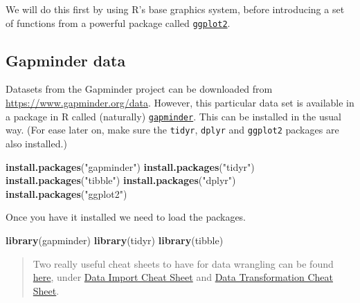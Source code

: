 \documentclass[]{book}
\newenvironment{Shaded}{\begin{snugshade}}{\end{snugshade}}
\newcommand{\KeywordTok}[1]{\textcolor[rgb]{0.13,0.29,0.53}{\textbf{{#1}}}}
\newcommand{\StringTok}[1]{\textcolor[rgb]{0.31,0.60,0.02}{{#1}}}
\newcommand{\NormalTok}[1]{{#1}}
\theoremstyle{definition}
\theoremstyle{definition}
\theoremstyle{definition}
\theoremstyle{remark}
\begin{document}
We will do this first by using R's base graphics system, before
introducing a set of functions from a powerful package called
\href{https://cran.r-project.org/web/packages/ggplot2/index.html}{\texttt{ggplot2}}.

\subsection{Gapminder data}\label{gapminder-data}

Datasets from the Gapminder project can be downloaded from
\url{https://www.gapminder.org/data}. However, this particular data set
is available in a package in R called (naturally)
\href{https://cran.r-project.org/web/packages/gapminder/index.html}{\texttt{gapminder}}.
This can be installed in the usual way. (For ease later on, make sure
the \texttt{tidyr}, \texttt{dplyr} and \texttt{ggplot2} packages are
also installed.)

\begin{Shaded}
\begin{Highlighting}[]
\KeywordTok{install.packages}\NormalTok{(}\StringTok{"gapminder"}\NormalTok{)}
\KeywordTok{install.packages}\NormalTok{(}\StringTok{"tidyr"}\NormalTok{)}
\KeywordTok{install.packages}\NormalTok{(}\StringTok{"tibble"}\NormalTok{)}
\KeywordTok{install.packages}\NormalTok{(}\StringTok{"dplyr"}\NormalTok{)}
\KeywordTok{install.packages}\NormalTok{(}\StringTok{"ggplot2"}\NormalTok{)}
\end{Highlighting}
\end{Shaded}

Once you have it installed we need to load the packages.

\begin{Shaded}
\begin{Highlighting}[]
\KeywordTok{library}\NormalTok{(gapminder)}
\KeywordTok{library}\NormalTok{(tidyr)}
\KeywordTok{library}\NormalTok{(tibble)}
\end{Highlighting}
\end{Shaded}

\begin{quote}
Two really useful cheat sheets to have for data wrangling can be found
\href{https://www.rstudio.com/resources/cheatsheets/}{here}, under
\href{https://github.com/rstudio/cheatsheets/raw/master/source/pdfs/data-import-cheatsheet.pdf}{Data
Import Cheat Sheet} and
\href{https://github.com/rstudio/cheatsheets/raw/master/source/pdfs/data-transformation-cheatsheet.pdf}{Data
Transformation Cheat Sheet}.
\end{quote}
\end{document}
